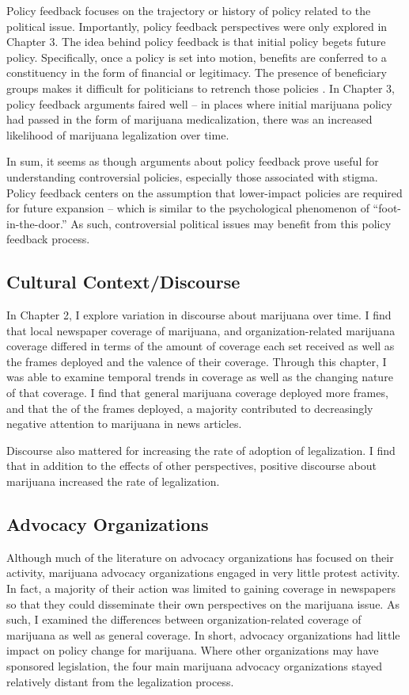 Policy feedback focuses on the trajectory or history of policy related to the political issue. Importantly, policy feedback perspectives were only explored in Chapter 3. The idea behind policy feedback is that initial policy begets future policy. Specifically, once a policy is set into motion, benefits are conferred to a constituency in the form of financial or legitimacy. The presence of beneficiary groups makes it difficult for politicians to retrench those policies \citep{pierson_2000}. In Chapter 3, policy feedback arguments faired well -- in places where initial marijuana policy had passed in the form of marijuana medicalization, there was an increased likelihood of marijuana legalization over time. 

In sum, it seems as though arguments about policy feedback prove useful for understanding controversial policies, especially those associated with stigma. Policy feedback centers on the assumption that lower-impact policies are required for future expansion -- which is similar to the psychological phenomenon of ``foot-in-the-door.'' As such, controversial political issues may benefit from this policy feedback process. 


\subsection{Cultural Context/Discourse}

In Chapter 2, I explore variation in discourse about marijuana over time. I find that local newspaper coverage of marijuana, and organization-related marijuana coverage differed in terms of the amount of coverage each set received as well as the frames deployed and the valence of their coverage. Through this chapter, I was able to examine temporal trends in coverage as well as the changing nature of that coverage. I find that general marijuana coverage deployed more frames, and that the of the frames deployed, a majority contributed to decreasingly negative attention to marijuana in news articles. 

Discourse also mattered for increasing the rate of adoption of legalization. I find that in addition to the effects of other perspectives, positive discourse about marijuana increased the rate of legalization. 


\subsection{Advocacy Organizations}

Although much of the literature on advocacy organizations has focused on their activity, marijuana advocacy organizations engaged in very little protest activity. In fact, a majority of their action was limited to gaining coverage in newspapers so that they could disseminate their own perspectives on the marijuana issue. As such, I examined the differences between organization-related coverage of marijuana as well as general coverage. In short, advocacy organizations had little impact on policy change for marijuana. Where other organizations may have sponsored legislation, the four main marijuana advocacy organizations stayed relatively distant from the legalization process. 


